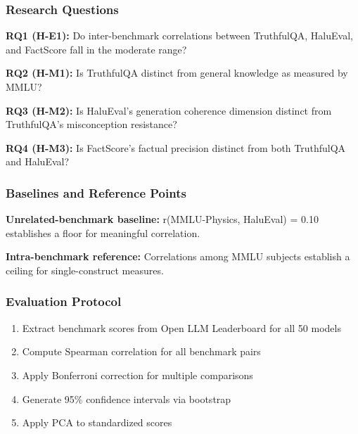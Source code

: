 
\subsubsection{Research Questions}

\textbf{RQ1 (H-E1):} Do inter-benchmark correlations between TruthfulQA, HaluEval, and FactScore fall in the moderate range?

\textbf{RQ2 (H-M1):} Is TruthfulQA distinct from general knowledge as measured by MMLU?

\textbf{RQ3 (H-M2):} Is HaluEval's generation coherence dimension distinct from TruthfulQA's misconception resistance?

\textbf{RQ4 (H-M3):} Is FactScore's factual precision distinct from both TruthfulQA and HaluEval?

\subsubsection{Baselines and Reference Points}

\textbf{Unrelated-benchmark baseline:} r(MMLU-Physics, HaluEval) = 0.10 establishes a floor for meaningful correlation.

\textbf{Intra-benchmark reference:} Correlations among MMLU subjects establish a ceiling for single-construct measures.

\subsubsection{Evaluation Protocol}

\begin{enumerate}
\item Extract benchmark scores from Open LLM Leaderboard for all 50 models
\item Compute Spearman correlation for all benchmark pairs
\item Apply Bonferroni correction for multiple comparisons
\item Generate 95\% confidence intervals via bootstrap
\item Apply PCA to standardized scores
\end{enumerate}
